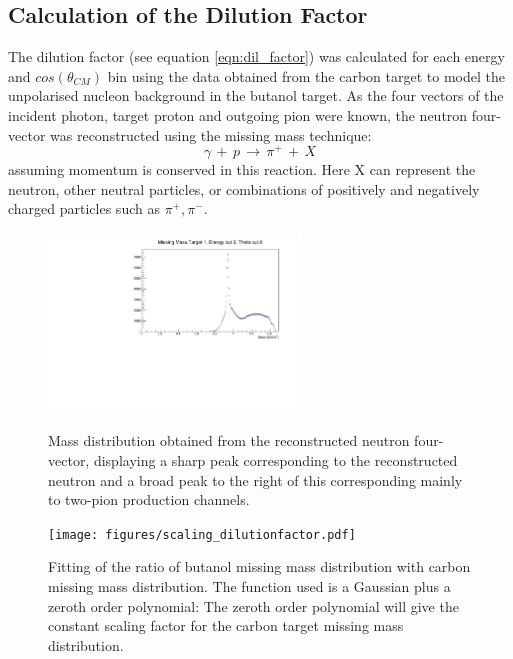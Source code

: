 \subsection{Calculation of the Dilution Factor}
\label{ch:dil_factor}
The dilution factor (see equation \ref{eqn:dil_factor}) was calculated for each energy and $cos(\theta_{CM})$ bin using the data obtained from the carbon target to model the unpolarised nucleon background in the butanol target.
As the four vectors of the incident photon, target proton and outgoing pion were known, the neutron four-vector was reconstructed using the missing mass technique:
$$
\gamma \, + \,  p \, \rightarrow \, \pi^+ \, + \, X
$$
assuming momentum is conserved in this reaction. Here X can represent the neutron, other neutral particles, or combinations of positively and negatively charged particles such as $\pi^+ , \pi^-$.
\begin{figure}[H]
  \begin{center}
    \includegraphics[width=0.6\textwidth]{figures/neutron_missingmass.pdf} \\
    \caption{Mass distribution obtained from the reconstructed neutron four-vector, displaying a sharp peak corresponding to the reconstructed neutron and
a broad peak to the right of this corresponding mainly to two-pion production channels. }
    \label{fig:frost_neutronmissing_ex}
  \end{center}
\end{figure}
\begin{figure}[H]
  \begin{center}
    \texttt{[image: figures/scaling\_dilutionfactor.pdf]} \\
    \caption{Fitting of the ratio of butanol missing mass distribution with carbon missing mass distribution. The function used is a Gaussian plus a zeroth order polynomial: The zeroth order polynomial will give the constant scaling factor for the carbon target missing mass distribution. }
    \label{fig:scaling_dilutionfactor}
  \end{center}
\end{figure}
